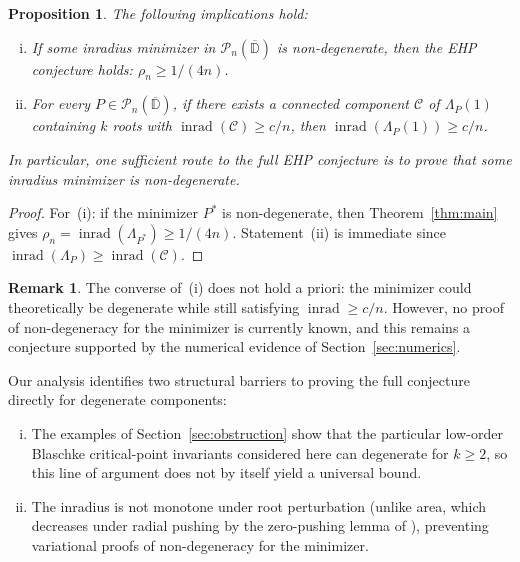 \documentclass[11pt,a4paper]{amsart}
\newtheorem{proposition}[theorem]{Proposition}
\theoremstyle{definition}
\newtheorem{remark}[theorem]{Remark}
\newcommand{\D}{\mathbb{D}}
\newcommand{\Pn}{\mathcal{P}_n}
\newcommand{\inrad}{\operatorname{inrad}}
\begin{document}
\begin{proposition}\label{prop:reduction}
The following implications hold:
\begin{enumerate}[(i)]
  \item If some inradius minimizer in $\Pn(\overline{\D})$
    is non-degenerate, then the EHP conjecture holds:
    $\rho_n \geq 1/(4n)$.
  \item For every $P \in \Pn(\overline{\D})$, if there exists a
    connected component $\mathcal{C}$ of $\Lambda_P(1)$ containing
    $k$ roots with $\inrad(\mathcal{C}) \geq c/n$, then
    $\inrad(\Lambda_P(1)) \geq c/n$.
\end{enumerate}
In particular, one sufficient route to the full EHP conjecture is to
prove that some inradius minimizer is non-degenerate.
\end{proposition}

\begin{proof}
For~(i): if the minimizer $P^*$ is non-degenerate, then
Theorem~\ref{thm:main} gives
$\rho_n = \inrad(\Lambda_{P^*}) \geq 1/(4n)$.
Statement~(ii) is immediate since
$\inrad(\Lambda_P) \geq \inrad(\mathcal{C})$.
\end{proof}

\begin{remark}
The converse of~(i) does not hold a priori: the minimizer could
theoretically be degenerate while still satisfying $\inrad \geq c/n$.
However, no proof of non-degeneracy for the minimizer is currently known,
and this remains a conjecture supported by the numerical evidence of
Section~\ref{sec:numerics}.
\end{remark}

Our analysis identifies two structural barriers to proving the
full conjecture directly for degenerate components:
\begin{enumerate}[(i)]
  \item The examples of Section~\ref{sec:obstruction} show that
    the particular low-order Blaschke critical-point invariants
    considered here can degenerate for
    $k \geq 2$, so this line of argument does not by itself yield
    a universal bound.
  \item The inradius is not monotone under root perturbation
    (unlike area, which decreases under radial pushing by the
    zero-pushing lemma of \cite{KLR25}), preventing variational
    proofs of non-degeneracy for the minimizer.
\end{enumerate}
\end{document}
